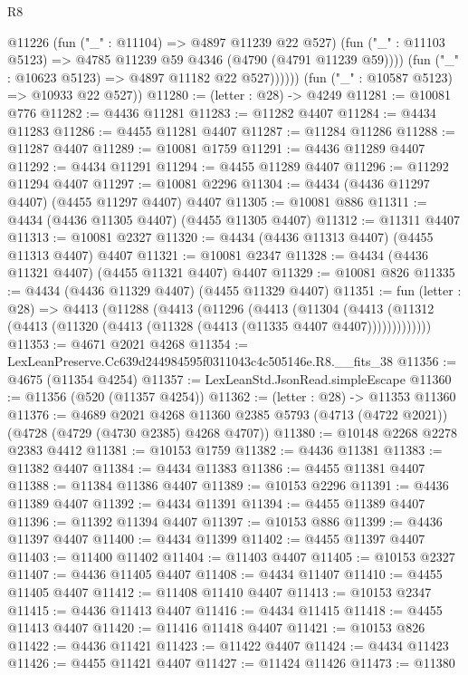 \begin{lexlean}{R8}
\begin{coremodule}
                @11226
                  (fun ("_" : @11104) => @4897 @11239 @22 @527)
                  (fun ("_" : @11103 @5123) => @4785 @11239 @59 @4346 (@4790 (@4791 @11239 @59))))
                (fun ("_" : @10623 @5123) => @4897 @11182 @22 @527))))))
      (fun ("_" : @10587 @5123) => @10933 @22 @527))
@11280 := (letter : @28) -> @4249
@11281 := @10081 @776
@11282 := @4436 @11281
@11283 := @11282 @4407
@11284 := @4434 @11283
@11286 := @4455 @11281 @4407
@11287 := @11284 @11286
@11288 := @11287 @4407
@11289 := @10081 @1759
@11291 := @4436 @11289 @4407
@11292 := @4434 @11291
@11294 := @4455 @11289 @4407
@11296 := @11292 @11294 @4407
@11297 := @10081 @2296
@11304 := @4434 (@4436 @11297 @4407) (@4455 @11297 @4407) @4407
@11305 := @10081 @886
@11311 := @4434 (@4436 @11305 @4407) (@4455 @11305 @4407)
@11312 := @11311 @4407
@11313 := @10081 @2327
@11320 := @4434 (@4436 @11313 @4407) (@4455 @11313 @4407) @4407
@11321 := @10081 @2347
@11328 := @4434 (@4436 @11321 @4407) (@4455 @11321 @4407) @4407
@11329 := @10081 @826
@11335 := @4434 (@4436 @11329 @4407) (@4455 @11329 @4407)
@11351 := fun (letter : @28) =>
  @4413
    (@11288
      (@4413
        (@11296
          (@4413
            (@11304
              (@4413 (@11312 (@4413 (@11320 (@4413 (@11328 (@4413 (@11335 @4407 @4407)))))))))))))
@11353 := @4671 @2021 @4268
@11354 := LexLeanPreserve.Cc639d244984595f0311043c4c505146e.R8.__fits_38
@11356 := @4675 (@11354 @4254)
@11357 := LexLeanStd.JsonRead.simpleEscape
@11360 := @11356 (@520 (@11357 @4254))
@11362 := (letter : @28) -> @11353 @11360
@11376 := @4689
    @2021
    @4268
    @11360
    @2385
    @5793
    (@4713 (@4722 @2021))
    (@4728 (@4729 (@4730 @2385) @4268 @4707))
@11380 := @10148 @2268 @2278 @2383 @4412
@11381 := @10153 @1759
@11382 := @4436 @11381
@11383 := @11382 @4407
@11384 := @4434 @11383
@11386 := @4455 @11381 @4407
@11388 := @11384 @11386 @4407
@11389 := @10153 @2296
@11391 := @4436 @11389 @4407
@11392 := @4434 @11391
@11394 := @4455 @11389 @4407
@11396 := @11392 @11394 @4407
@11397 := @10153 @886
@11399 := @4436 @11397 @4407
@11400 := @4434 @11399
@11402 := @4455 @11397 @4407
@11403 := @11400 @11402
@11404 := @11403 @4407
@11405 := @10153 @2327
@11407 := @4436 @11405 @4407
@11408 := @4434 @11407
@11410 := @4455 @11405 @4407
@11412 := @11408 @11410 @4407
@11413 := @10153 @2347
@11415 := @4436 @11413 @4407
@11416 := @4434 @11415
@11418 := @4455 @11413 @4407
@11420 := @11416 @11418 @4407
@11421 := @10153 @826
@11422 := @4436 @11421
@11423 := @11422 @4407
@11424 := @4434 @11423
@11426 := @4455 @11421 @4407
@11427 := @11424 @11426
@11473 := @11380

\end{coremodule}
\end{lexlean}
